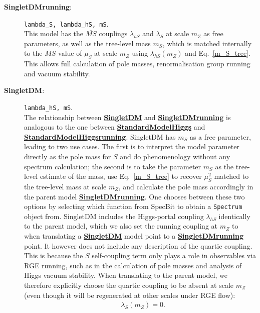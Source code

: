 \documentclass[pdftex,twocolumn,epjc3_preprint,runningheads]{svjour3}
\renewcommand{\_}{\discretionary{\underscore}{}{\underscore}}
\newcommand\cpp[1]{{\lstinline!#1!}}  %
\newcommand\term[1]{{\lstset{style=terminal}\lstinline!#1!\lstset{style=cpp}}}
\newcommand{\doublecrosssf}[2]{\hyperref[#2]{\textbf{\textsf{#1}}}}
\newcommand{\gsfitemc}[1]{\item[\textbf{\textsf{#1}}\label{#1}:]}
\newcommand{\sss}{\scriptscriptstyle}
\newcommand{\lhs}{\lambda_{h\sss S}}
\newcommand{\ls}{\lambda_{\sss S}}
\newcommand{\MSbar}{$\MSBar$\xspace}
\newcommand{\MSBar}{\overline{MS}}
\newcommand{\specbit}{\textsf{SpecBit}\xspace}
\begin{document}
\begin{description}

\item[\textbf{\textsf{SingletDM\_running}}\label{SS_run}:] \term{lambda_S, lambda_hS, mS}.\\
This model has the \MSbar couplings $\lhs$ and $\ls$ at scale $m_Z$ as free parameters, as well as the tree-level mass $m_S$, which is matched internally to the \MSbar value of $\mu_S$ at scale $m_Z$ using $\lhs(m_Z)$ and Eq.\ \ref{m_S_tree}.  This allows full calculation of pole masses, renormalisation group running and vacuum stability.\vspace{2mm}

\gsfitemc{SingletDM} \term{lambda_hS, mS}.\\
The relationship between \doublecrosssf{SingletDM}{SingletDM} and \doublecrosssf{SingletDM\_running}{SS_run} is analogous to the one between \doublecrosssf{StandardModel\_Higgs}{SM_h} and \doublecrosssf{StandardModel\_Higgs\_running}{SM_h_run}.  \textsf{SingletDM} has $m_S$ as a free parameter, leading to two use cases.  The first is to interpret the model parameter directly as the pole mass for $S$ and do phenomenology without any spectrum calculation; the second is to take the parameter $m_S$ as the tree-level estimate of the mass, use Eq.\ \ref{m_S_tree} to recover $\mu_S^2$ matched to the tree-level mass at scale $m_Z$, and calculate the pole mass accordingly in the parent model \doublecrosssf{SingletDM\_running}{SS_run}.  One chooses between these two options by selecting which function from \specbit to obtain a \cpp{Spectrum} object from.  \textsf{SingletDM} includes the Higgs-portal coupling $\lhs$ identically to the parent model, which we also set the running coupling at $m_Z$ to when translating a \doublecrosssf{SingletDM}{SingletDM} model point to a \doublecrosssf{SingletDM\_running}{SS_run} point.  It however does not include any description of the quartic coupling.  This is because the $S$ self-coupling term only plays a role in observables via RGE running, such as in the calculation of pole masses and analysis of Higgs vacuum stability.  When translating to the parent model, we therefore explicitly choose the quartic coupling to be absent at scale $m_Z$ (even though it will be regenerated at other scales under RGE flow):
\begin{align}
&\ls(m_Z) = 0.
\end{align}

\end{description}
\end{document}
